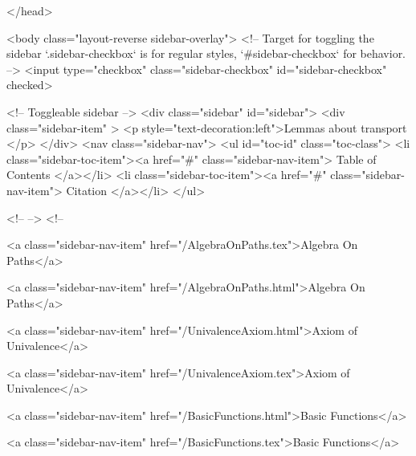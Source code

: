   
</head>




  <body class="layout-reverse sidebar-overlay">
    <!-- Target for toggling the sidebar `.sidebar-checkbox` is for regular
     styles, `#sidebar-checkbox` for behavior. -->
<input type="checkbox" class="sidebar-checkbox" id="sidebar-checkbox" checked>

<!-- Toggleable sidebar -->
<div class="sidebar" id="sidebar">
  <div class="sidebar-item" >
    <p style="text-decoration:left">Lemmas about transport </p>
  </div>
  <nav class="sidebar-nav">
    <ul id="toc-id" class="toc-class">
  <li class="sidebar-toc-item"><a href="#" class="sidebar-nav-item"> Table of Contents </a></li>
  <li class="sidebar-toc-item"><a href="#" class="sidebar-nav-item"> Citation </a></li>
</ul>


    <!--  -->
    <!-- 
      
    
      
    
      
    
      
        
      
    
      
        
          <a class="sidebar-nav-item" href="/AlgebraOnPaths.tex">Algebra On Paths</a>
        
      
    
      
        
          <a class="sidebar-nav-item" href="/AlgebraOnPaths.html">Algebra On Paths</a>
        
      
    
      
        
          <a class="sidebar-nav-item" href="/UnivalenceAxiom.html">Axiom of Univalence</a>
        
      
    
      
        
          <a class="sidebar-nav-item" href="/UnivalenceAxiom.tex">Axiom of Univalence</a>
        
      
    
      
        
          <a class="sidebar-nav-item" href="/BasicFunctions.html">Basic Functions</a>
        
      
    
      
        
          <a class="sidebar-nav-item" href="/BasicFunctions.tex">Basic Functions</a>
        
      
    
